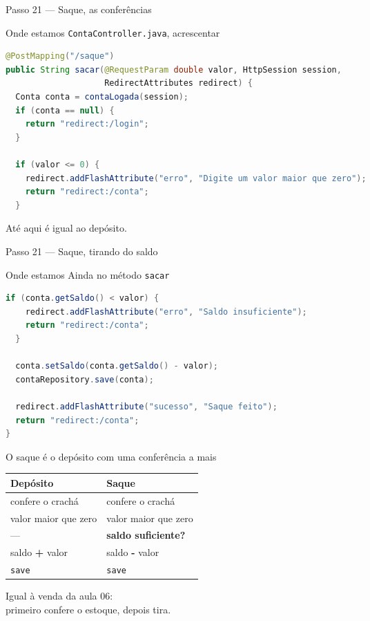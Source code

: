 \documentclass[aspectratio=169,11pt]{beamer}
\newcommand{\onde}[1]{%
  \begin{block}{Onde estamos}
    #1
  \end{block}
}
\begin{document}
\begin{frame}[fragile]{Passo 21 --- Saque, as conferências}
  \onde{\texttt{ContaController.java}, acrescentar}

\begin{lstlisting}[language=Java,basicstyle=\ttfamily\scriptsize]
@PostMapping("/saque")
public String sacar(@RequestParam double valor, HttpSession session,
                    RedirectAttributes redirect) {
  Conta conta = contaLogada(session);
  if (conta == null) {
    return "redirect:/login";
  }

  if (valor <= 0) {
    redirect.addFlashAttribute("erro", "Digite um valor maior que zero");
    return "redirect:/conta";
  }
\end{lstlisting}

  Até aqui é igual ao depósito.
\end{frame}

\begin{frame}[fragile]{Passo 21 --- Saque, tirando do saldo}
  \onde{Ainda no método \texttt{sacar}}

\begin{lstlisting}[language=Java,basicstyle=\ttfamily\footnotesize]
  if (conta.getSaldo() < valor) {
    redirect.addFlashAttribute("erro", "Saldo insuficiente");
    return "redirect:/conta";
  }

  conta.setSaldo(conta.getSaldo() - valor);
  contaRepository.save(conta);

  redirect.addFlashAttribute("sucesso", "Saque feito");
  return "redirect:/conta";
}
\end{lstlisting}
\end{frame}

\begin{frame}{O saque é o depósito com uma conferência a mais}
  \begin{center}
  \begin{tabular}{ll}
    \toprule
    Depósito & Saque \\
    \midrule
    confere o crachá & confere o crachá \\
    valor maior que zero & valor maior que zero \\
    --- & \textbf{saldo suficiente?} \\
    saldo \textbf{+} valor & saldo \textbf{-} valor \\
    \texttt{save} & \texttt{save} \\
    \bottomrule
  \end{tabular}
  \end{center}

  \vspace{0.6em}
  Igual à venda da aula 06:\\
  primeiro confere o estoque, depois tira.
\end{frame}
\end{document}
